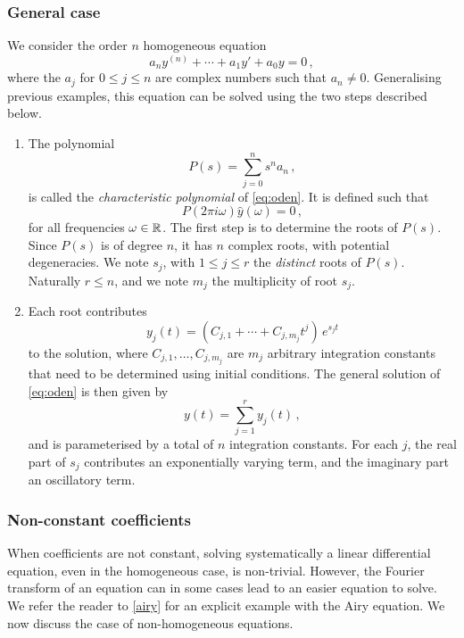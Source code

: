 \subsubsection{General case}
We consider the order $n$ homogeneous equation
\begin{equation}
  a_ny^{(n)}+\cdots+a_1y'+a_0y=0\,,\label{eq:oden}
\end{equation}
where the $a_j$ for $0\leq j\leq n$ are complex numbers such that $a_n\neq 0$.
Generalising previous examples, this equation can be solved using the two steps described
below.
\begin{enumerate}
  \item The polynomial
    \begin{equation}
      P(s)=\sum_{j=0}^{n} s^na_n\,,
    \end{equation}
    is called the \emph{characteristic polynomial} of \cref{eq:oden}. It is defined such
    that
    \begin{equation}
      P(2\pi i\omega)\hat{y}(\omega)=0\,,
    \end{equation}
    for all frequencies $\omega\in\mathbb{R}$. The first step is to determine the roots of $P(s)$.
    Since $P(s)$ is of degree $n$, it has $n$ complex roots, with potential degeneracies.
    We note $s_j$, with $1\leq j\leq r$ the \emph{distinct} roots of $P(s)$. Naturally
    $r\leq n$, and we note $m_j$ the multiplicity of root $s_j$.
  \item Each root contributes
    \begin{equation}
      y_j(t)=(C_{j,1}+\cdots+C_{j,m_j}t^j)\,e^{s_jt}
    \end{equation}
    to the solution, where $C_{j,1},\dots,C_{j,m_j}$ are $m_j$ arbitrary integration
    constants that need to be determined using initial conditions. The general solution of
    \cref{eq:oden} is then given by
    \begin{equation}
      y(t)=\sum_{j=1}^{r}y_j(t)\,,
    \end{equation}
    and is parameterised by a total of $n$ integration constants. For each $j$, the real
    part of $s_j$ contributes an exponentially varying term, and the imaginary part an
    oscillatory term.
\end{enumerate}
\subsubsection{Non-constant coefficients}
When coefficients are not constant, solving systematically a linear differential equation,
even in the homogeneous case, is non-trivial. However, the Fourier transform of an
equation can in some cases lead to an easier equation to solve. We refer the reader to
\cref{airy} for an explicit example with the Airy equation. We now discuss the case of
non-homogeneous equations.
